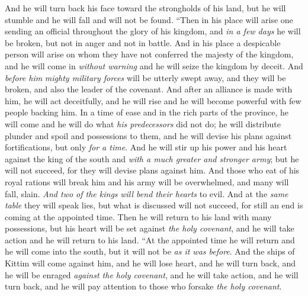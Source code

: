 \begin{biblechapter}
\verse And he will turn back his face toward the strongholds of his land, but he will stumble and he will fall and will not be found.
\verse “Then in his place will arise one sending an official throughout the glory of his kingdom, and \textit{in a few days} he will be broken, but not in anger and not in battle.
\verse And in his place a despicable person will arise on whom they have not conferred the majesty of the kingdom, and he will come in \textit{without warning} and he will seize the kingdom by deceit.
\verse And \textit{before him} \textit{mighty military forces} will be utterly swept away, and they will be broken, and also the leader of the covenant.
\verse And after an alliance is made with him, he will act deceitfully, and he will rise and he will become powerful with few people backing him.
\verse In a time of ease and in the rich parts of the province, he will come and he will do what \textit{his predecessors} did not do; he will distribute plunder and spoil and possessions to them, and he will devise his plans against fortifications, but only \textit{for a time}.
\verse And he will stir up his power and his heart against the king of the south and \textit{with a much greater and stronger army}; but he will not succeed, for they will devise plans against him.
\verse And those who eat of his royal rations will break him and his army will be overwhelmed, and many will fall, slain.
\verse \textit{And two of the kings} \textit{will bend their hearts} to evil. And at the \textit{same table} they will speak lies, but what is discussed will not succeed, for still an end is coming at the appointed time.
\verse Then he will return to his land with many possessions, but his heart will be set against \textit{the holy covenant}, and he will take action and he will return to his land.
\verse “At the appointed time he will return and he will come into the south, but it will not be \textit{as it was before}.
\verse And the ships of Kittim will come against him, and he will lose heart, and he will turn back, and he will be enraged \textit{against the holy covenant}, and he will take action, and he will turn back, and he will pay attention to those who forsake \textit{the holy covenant}.

\end{biblechapter}
